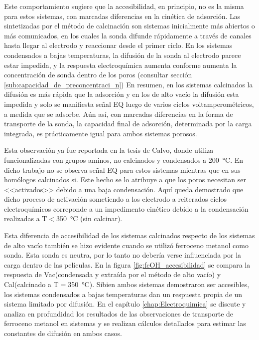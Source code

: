       Este comportamiento sugiere que la accesibilidad, en principio, no es la misma para estos sistemas, con marcadas diferencias en la cinética de adsorción. Las \pdmF\space sintetizadas por el método de calcinación son sistemas inicialmente más abiertos o más comunicados, en los cuales la sonda difunde rápidamente a través de canales hasta llegar al electrodo y reaccionar desde el primer ciclo. En los sistemas condensados a bajas temperaturas, la difusión de la sonda al electrodo parece estar impedida, y la respuesta electroquímica aumenta conforme aumenta la concentración de sonda dentro de los poros (consultar sección \ref{sub:capacidad_de_preconcentraci_n}) En resumen, en los sistemas calcinados la difusión es más rápida que la adsorción y en los de alto vacío la difusión esta impedida y solo se manifiesta señal EQ luego de varios ciclos voltamperométricos, a medida que se adsorbe. Aún así, con marcadas diferencias en la forma de transporte de la sonda, la capacidad final de adsorción, determinada por la carga integrada, es prácticamente igual para ambos sistemas porosos.

      Esta observación ya fue reportada en la tesis de Calvo\cite{Calvo20210}, donde utiliza \pdmF\space funcionalizadas con grupos aminos, no calcinados y condensados a \SI{200}{\celsius}. En dicho trabajo no se observa señal EQ para estos sistemas mientras que en sus homólogos calcinados si. Este hecho se lo atribuye a que los poros necesitan ser <<activados>> debido a una baja condensación. Aquí queda demostrado que dicho proceso de activación sometiendo a los electrodo a reiterados ciclos electroquímicos correponde a un impedimento cinético debido a la condensación realizadas a T$<$\SI{350}{\celsius} (sin calcinar).

      Esta diferencia de accesibilidad de los sistemas calcinados respecto de los sistemas de alto vacío también se hizo evidente cuando se utilizó ferroceno metanol como sonda. Esta sonda es neutra, por lo tanto no debería verse influenciada por la carga dentro de las películas. En la figura \ref{fig:fcOH_accesibilidad} se compara la respuesta de Vac\pdmF\space (condensada y extraída por el método de alto vacío) y Cal\pdmF\space (calcinado a T$=$\SI{350}{\celsius}). Si\space bien ambos sistemas demostraron ser accesibles, los sistemas condensados a bajas temperaturas dan un respuesta propia de un sistema limitado por difusión. En el capítulo \ref{chap:Electroquimica} se discute y analiza en profundidad los resultados de las observaciones de transporte de ferroceno metanol en sistemas \pdmF\space y se realizan cálculos detallados para estimar las constantes de difusión en ambos casos.

